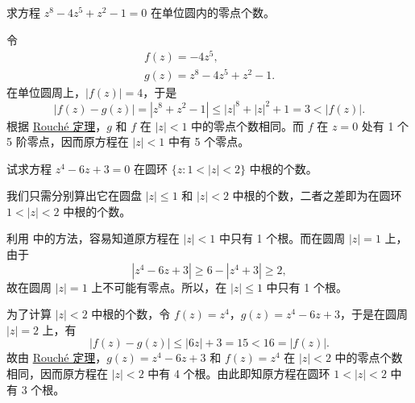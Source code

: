 \documentclass[../../main.tex]{subfiles}%
\begin{document}
\begin{example}\label{example:例4.4.12}
求方程 \( z^8 - 4z^5 + z^2 - 1 = 0 \) 在单位圆内的零点个数。
\end{example}
\begin{solution}

令
\begin{gather*}
f(z) = -4z^5,
\\
g(z) = z^8 - 4z^5 + z^2 - 1.
\end{gather*}
在单位圆周上，\( |f(z)| = 4 \)，于是
\[
|f(z) - g(z)| = |z^8 + z^2 - 1| \leqslant  |z|^8 + |z|^2 + 1 = 3 < |f(z)|.
\]
根据 \hyperref[theorem:Rouché定理-定理4.4.3]{Rouché 定理}，\( g \) 和 \( f \) 在 \( |z| < 1 \) 中的零点个数相同。而 \( f \) 在 \( z = 0 \) 处有 1 个 5 阶零点，因而原方程在 \( |z| < 1 \) 中有 5 个零点。 

\end{solution}

\begin{example}
试求方程 \( z^4 - 6z + 3 = 0 \) 在圆环 \( \{ z : 1 < |z| < 2 \} \) 中根的个数。
\end{example}
\begin{solution}

我们只需分别算出它在圆盘 \( |z| \leqslant  1 \) 和 \( |z| < 2 \) 中根的个数，二者之差即为在圆环 \( 1 < |z| < 2 \) 中根的个数。

利用 中的方法，容易知道原方程在 \( |z| < 1 \) 中只有 1 个根。而在圆周 \( |z| = 1 \) 上，由于
\[
|z^4 - 6z + 3| \geqslant  6 - |z^4 + 3| \geqslant  2,
\]
故在圆周 \( |z| = 1 \) 上不可能有零点。所以，在 \( |z| \leqslant  1 \) 中只有 1 个根。

为了计算 \( |z| < 2 \) 中根的个数，令 \( f(z) = z^4 \)，\( g(z) = z^4 - 6z + 3 \)，于是在圆周 \( |z| = 2 \) 上，有
\[
|f(z) - g(z)| \leqslant  |6z| + 3 = 15 < 16 = |f(z)|.
\]
故由 \hyperref[theorem:Rouché定理-定理4.4.3]{Rouché 定理}，\( g(z) = z^4 - 6z + 3 \) 和 \( f(z) = z^4 \) 在 \( |z| < 2 \) 中的零点个数相同，因而原方程在 \( |z| < 2 \) 中有 4 个根。由此即知原方程在圆环 \( 1 < |z| < 2 \) 中有 3 个根。 

\end{solution}
\end{document}

